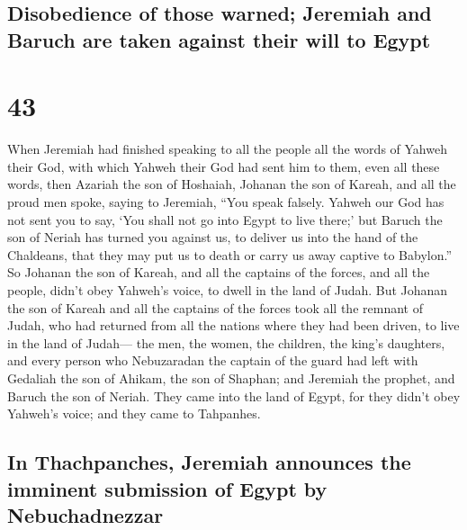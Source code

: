 \hypertarget{disobedience-of-those-warned-jeremiah-and-baruch-are-taken-against-their-will-to-egypt}{%
\subsection{Disobedience of those warned; Jeremiah and Baruch are taken
against their will to
Egypt}\label{disobedience-of-those-warned-jeremiah-and-baruch-are-taken-against-their-will-to-egypt}}

\hypertarget{section-42}{%
\section{43}\label{section-42}}

 When Jeremiah had finished speaking to all the people all
the words of Yahweh their God, with which Yahweh their God had sent him
to them, even all these words,  then Azariah the son of
Hoshaiah, Johanan the son of Kareah, and all the proud men spoke, saying
to Jeremiah, ``You speak falsely. Yahweh our God has not sent you to
say, `You shall not go into Egypt to live there;'  but
Baruch the son of Neriah has turned you against us, to deliver us into
the hand of the Chaldeans, that they may put us to death or carry us
away captive to Babylon.''  So Johanan the son of Kareah,
and all the captains of the forces, and all the people, didn't obey
Yahweh's voice, to dwell in the land of Judah.  But
Johanan the son of Kareah and all the captains of the forces took all
the remnant of Judah, who had returned from all the nations where they
had been driven, to live in the land of Judah---  the men,
the women, the children, the king's daughters, and every person who
Nebuzaradan the captain of the guard had left with Gedaliah the son of
Ahikam, the son of Shaphan; and Jeremiah the prophet, and Baruch the son
of Neriah.  They came into the land of Egypt, for they
didn't obey Yahweh's voice; and they came to Tahpanhes.

\hypertarget{in-thachpanches-jeremiah-announces-the-imminent-submission-of-egypt-by-nebuchadnezzar}{%
\subsection{In Thachpanches, Jeremiah announces the imminent submission
of Egypt by
Nebuchadnezzar}\label{in-thachpanches-jeremiah-announces-the-imminent-submission-of-egypt-by-nebuchadnezzar}}

